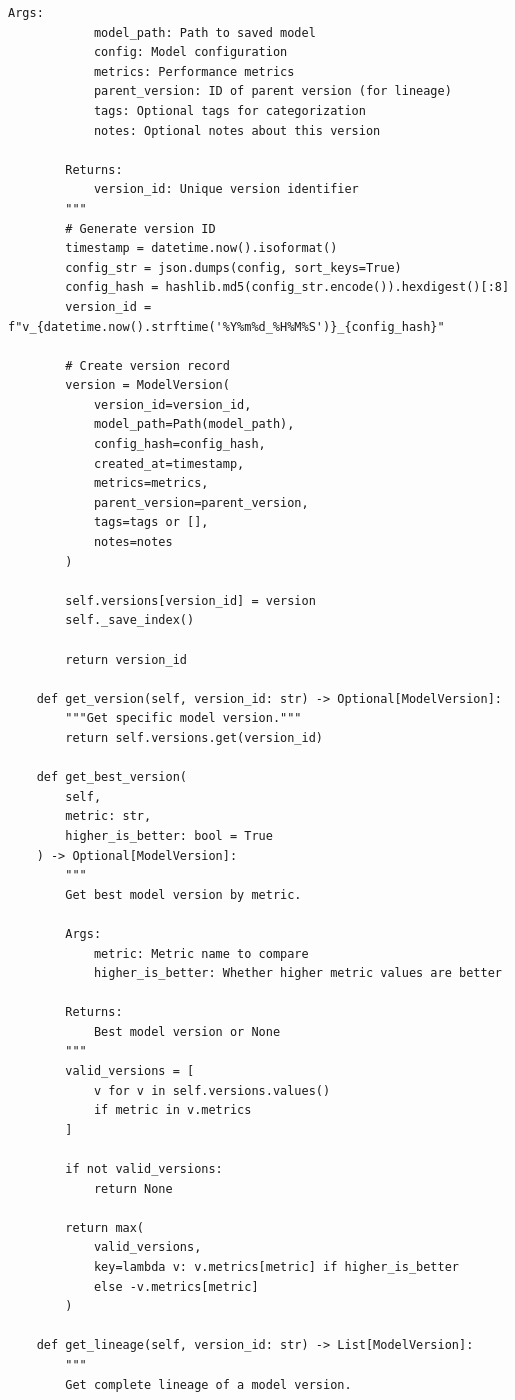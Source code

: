 \begin{lstlisting}[style=python, caption=Model versioning and experiment tracking]
        Args:
            model_path: Path to saved model
            config: Model configuration
            metrics: Performance metrics
            parent_version: ID of parent version (for lineage)
            tags: Optional tags for categorization
            notes: Optional notes about this version

        Returns:
            version_id: Unique version identifier
        """
        # Generate version ID
        timestamp = datetime.now().isoformat()
        config_str = json.dumps(config, sort_keys=True)
        config_hash = hashlib.md5(config_str.encode()).hexdigest()[:8]
        version_id = f"v_{datetime.now().strftime('%Y%m%d_%H%M%S')}_{config_hash}"

        # Create version record
        version = ModelVersion(
            version_id=version_id,
            model_path=Path(model_path),
            config_hash=config_hash,
            created_at=timestamp,
            metrics=metrics,
            parent_version=parent_version,
            tags=tags or [],
            notes=notes
        )

        self.versions[version_id] = version
        self._save_index()

        return version_id

    def get_version(self, version_id: str) -> Optional[ModelVersion]:
        """Get specific model version."""
        return self.versions.get(version_id)

    def get_best_version(
        self,
        metric: str,
        higher_is_better: bool = True
    ) -> Optional[ModelVersion]:
        """
        Get best model version by metric.

        Args:
            metric: Metric name to compare
            higher_is_better: Whether higher metric values are better

        Returns:
            Best model version or None
        """
        valid_versions = [
            v for v in self.versions.values()
            if metric in v.metrics
        ]

        if not valid_versions:
            return None

        return max(
            valid_versions,
            key=lambda v: v.metrics[metric] if higher_is_better
            else -v.metrics[metric]
        )

    def get_lineage(self, version_id: str) -> List[ModelVersion]:
        """
        Get complete lineage of a model version.


\end{lstlisting}

